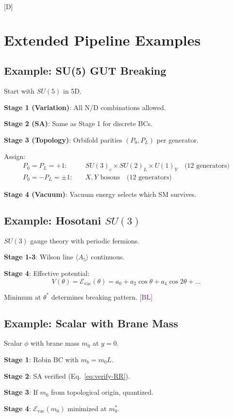 \documentclass[11pt,a4paper]{article}
\newcommand{\tagD}{\textcolor{blue!70!black}{[D]}}
\newcommand{\tagBL}{\textcolor{purple}{[BL]}}
\begin{document}
\tagD

\section{Extended Pipeline Examples}
\label{app:examples}

\subsection{Example: SU(5) GUT Breaking}

Start with $SU(5)$ in 5D.

\textbf{Stage 1 (Variation)}: All N/D combinations allowed.

\textbf{Stage 2 (SA)}: Same as Stage 1 for discrete BCs.

\textbf{Stage 3 (Topology)}: Orbifold parities $(P_0, P_L)$ per generator.

Assign:
\begin{align}
\label{eq:app-su5-sm}
P_0 = P_L = +1: \quad & SU(3)_c \times SU(2)_L \times U(1)_Y \quad \text{(12 generators)} \\
\label{eq:app-su5-broken}
P_0 = -P_L = \pm 1: \quad & X, Y \text{ bosons} \quad \text{(12 generators)}
\end{align}

\textbf{Stage 4 (Vacuum)}: Vacuum energy selects which SM survives.

\subsection{Example: Hosotani $SU(3)$}

$SU(3)$ gauge theory with periodic fermions.

\textbf{Stage 1-3}: Wilson line $\langle A_5 \rangle$ continuous.

\textbf{Stage 4}: Effective potential:
\begin{equation}
\label{eq:app-hosotani-V}
V(\theta) = \mathcal{E}_{\text{vac}}(\theta) = a_0 + a_2 \cos\theta + a_4 \cos 2\theta + \ldots
\end{equation}

Minimum at $\theta^*$ determines breaking pattern. \tagBL

\subsection{Example: Scalar with Brane Mass}

Scalar $\phi$ with brane mass $m_0$ at $y = 0$.

\textbf{Stage 1}: Robin BC with $m_b = m_0 L$.

\textbf{Stage 2}: SA verified (Eq.~\eqref{eq:verify-RR}).

\textbf{Stage 3}: If $m_0$ from topological origin, quantized.

\textbf{Stage 4}: $\mathcal{E}_{\text{vac}}(m_0)$ minimized at $m_0^*$.

\end{document}
